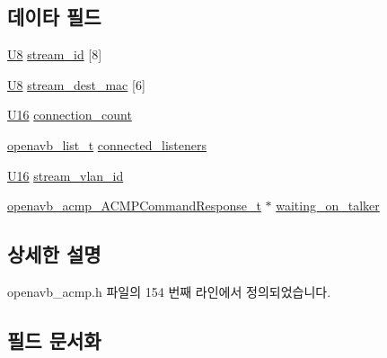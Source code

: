 \subsection*{데이타 필드}
\begin{DoxyCompactItemize}
\item 
\hyperlink{openavb__types__base__pub_8h_aa63ef7b996d5487ce35a5a66601f3e73}{U8} \hyperlink{structopenavb__acmp___talker_stream_info__t_a75d8c196686b96d97e0a271ac7b70da8}{stream\+\_\+id} \mbox{[}8\mbox{]}
\item 
\hyperlink{openavb__types__base__pub_8h_aa63ef7b996d5487ce35a5a66601f3e73}{U8} \hyperlink{structopenavb__acmp___talker_stream_info__t_a26087f365a751a1415364bfb5e2b8a0e}{stream\+\_\+dest\+\_\+mac} \mbox{[}6\mbox{]}
\item 
\hyperlink{openavb__types__base__pub_8h_a0a0a322d5fa4a546d293a77ba8b4a71f}{U16} \hyperlink{structopenavb__acmp___talker_stream_info__t_ad1ff24268593562ac5896a238d895b81}{connection\+\_\+count}
\item 
\hyperlink{openavb__list_8h_a4bebe3a638fd3dc94da5912774a18cfe}{openavb\+\_\+list\+\_\+t} \hyperlink{structopenavb__acmp___talker_stream_info__t_aa7e3334deb22142512cb56a6ff7cb46e}{connected\+\_\+listeners}
\item 
\hyperlink{openavb__types__base__pub_8h_a0a0a322d5fa4a546d293a77ba8b4a71f}{U16} \hyperlink{structopenavb__acmp___talker_stream_info__t_a31db70d552fc6f5d35875430fca593e6}{stream\+\_\+vlan\+\_\+id}
\item 
\hyperlink{structopenavb__acmp___a_c_m_p_command_response__t}{openavb\+\_\+acmp\+\_\+\+A\+C\+M\+P\+Command\+Response\+\_\+t} $\ast$ \hyperlink{structopenavb__acmp___talker_stream_info__t_a1dff04a37b0f132bc0eff5d08b178fe3}{waiting\+\_\+on\+\_\+talker}
\end{DoxyCompactItemize}


\subsection{상세한 설명}


openavb\+\_\+acmp.\+h 파일의 154 번째 라인에서 정의되었습니다.



\subsection{필드 문서화}
